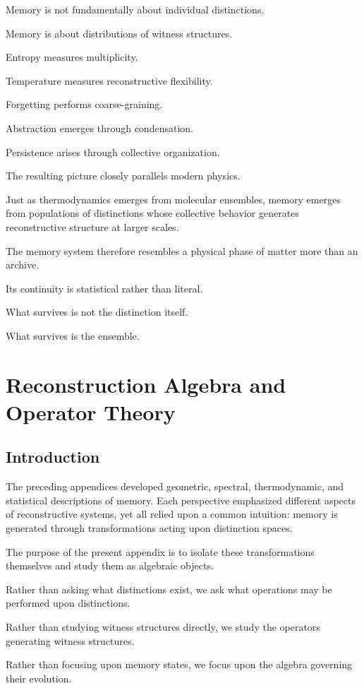 \documentclass[12pt,oneside]{book}
\theoremstyle{plain} \newtheorem{theorem}{Theorem}[chapter] \newtheorem{lemma}[theorem]{Lemma} \newtheorem{proposition}[theorem]{Proposition} \newtheorem{corollary}[theorem]{Corollary}
\theoremstyle{definition} \newtheorem{definition}[theorem]{Definition} \newtheorem{axiom}[theorem]{Axiom} \newtheorem{construction}[theorem]{Construction}
\theoremstyle{remark} \newtheorem{remark}[theorem]{Remark} \newtheorem{example}[theorem]{Example}
\begin{document}
Memory is not fundamentally about individual distinctions.

Memory is about distributions of witness structures.

Entropy measures multiplicity.

Temperature measures reconstructive flexibility.

Forgetting performs coarse-graining.

Abstraction emerges through condensation.

Persistence arises through collective organization.

The resulting picture closely parallels modern physics.

Just as thermodynamics emerges from molecular ensembles, memory emerges from populations of distinctions whose collective behavior generates reconstructive structure at larger scales.

The memory system therefore resembles a physical phase of matter more than an archive.

Its continuity is statistical rather than literal.

What survives is not the distinction itself.

What survives is the ensemble.

\chapter{Reconstruction Algebra and Operator Theory}

\section{Introduction}

The preceding appendices developed geometric, spectral, thermodynamic, and statistical descriptions of memory. Each perspective emphasized different aspects of reconstructive systems, yet all relied upon a common intuition: memory is generated through transformations acting upon distinction spaces.

The purpose of the present appendix is to isolate these transformations themselves and study them as algebraic objects.

Rather than asking what distinctions exist, we ask what operations may be performed upon distinctions.

Rather than studying witness structures directly, we study the operators generating witness structures.

Rather than focusing upon memory states, we focus upon the algebra governing their evolution.
\end{document}
